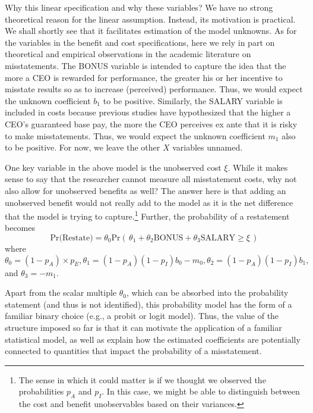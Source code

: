 Why this linear specification and why these variables? 
We have no strong theoretical reason for the linear assumption. 
Instead, its motivation is practical.
We shall shortly see that it facilitates estimation of the model unknowns.
As for the variables in the benefit and cost specifications, here we rely in part on theoretical and empirical observations in the academic literature on misstatements. 
The BONUS variable is intended to capture the idea that the more a CEO is rewarded for performance, the
greater his or her incentive to misstate results so as to increase (perceived) performance.
Thus, we would expect the unknown coefficient $b_1$ to be positive.
Similarly, the SALARY variable is included in costs because previous studies have hypothesized that the higher a CEO's guaranteed base pay, the more the CEO perceives ex ante that it is risky to make misstatements.
Thus, we would expect the unknown coefficient $m_1$ also to be positive.
For now, we leave the other $X$ variables unnamed.

One key variable in the above model is the unobserved cost $\xi$.
While it makes sense to say that the researcher cannot measure all misstatement costs, why not also allow for unobserved benefits as well?
The answer here is that adding an unobserved benefit would not really add to the model as it is the net difference that the model is trying to capture.\footnote{
The sense in which it could matter is if we thought we observed the probabilities
$p_A$ and $p_I$.
In this case, we might be able to distinguish between the cost and benefit unobservables based on their variances.}
Further, the probability of a restatement becomes
\begin{equation}\label{restate1}
\mbox{Pr(Restate)} = \theta_0 \mbox{Pr}\left(\, \theta_1 + \theta_2 \mbox{BONUS}
+ \theta_3 \mbox{SALARY}  \ge \xi \,\right)
\end{equation}
where $\theta_0=(1-p_A) \times p_{E}, \theta_1 = (1 - p_A)(1 - p_I) b_0 - m_0, 
\theta_2 = (1 - p_A)(1 - p_I) b_1,$ and $\theta_3 = - m_1$. 

Apart from the scalar multiple $\theta_0$, which can be absorbed into the probability statement (and thus is not identified), this probability model has the form of  a familiar binary choice (e.g., a probit or logit model).
Thus, the value of the structure imposed so far is that it can motivate the application of a familiar statistical model, as  well as explain how the estimated coefficients are potentially connected to quantities that impact the probability of a misstatement.

